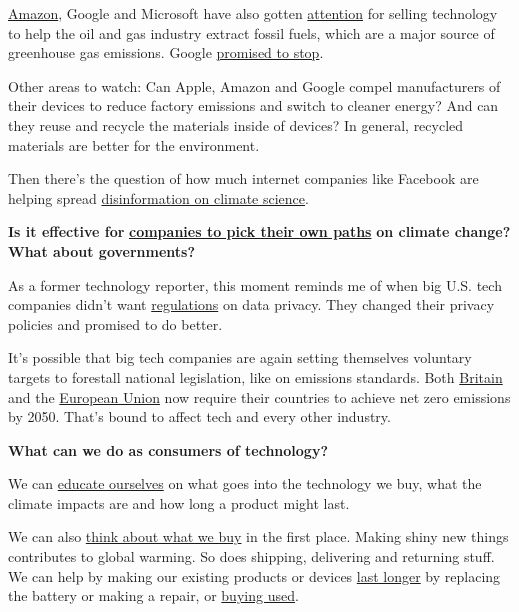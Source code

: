\href{https://www.nytimes3xbfgragh.onion/2019/04/10/technology/amazon-climate-change-letter.html}{Amazon},
Google and Microsoft have also gotten
\href{https://www.greenpeace.org/usa/reports/oil-in-the-cloud/}{attention}
for selling technology to help the oil and gas industry extract fossil
fuels, which are a major source of greenhouse gas emissions. Google
\href{https://www.cnbc.com/2020/05/20/google-ai-greenpeace-oil-gas.html}{promised
to stop}.

Other areas to watch: Can Apple, Amazon and Google compel manufacturers
of their devices to reduce factory emissions and switch to cleaner
energy? And can they reuse and recycle the materials inside of devices?
In general, recycled materials are better for the environment.

Then there's the question of how much internet companies like Facebook
are helping spread
\href{https://heated.world/p/fact-check-of-viral-climate-misinformation}{disinformation
on climate science}.

\textbf{Is it effective for}
\textbf{\href{https://www.nytimes3xbfgragh.onion/2020/01/23/business/corporate-climate-davos.html}{companies
to pick their own paths}} \textbf{on climate change? What about
governments?}

As a former technology reporter, this moment reminds me of when big U.S.
tech companies didn't want
\href{https://www.nytimes3xbfgragh.onion/2013/10/31/technology/no-us-action-so-states-move-on-privacy-law.html}{regulations}
on data privacy. They changed their privacy policies and promised to do
better.

It's possible that big tech companies are again setting themselves
voluntary targets to forestall national legislation, like on emissions
standards. Both
\href{https://www.gov.uk/government/news/uk-becomes-first-major-economy-to-pass-net-zero-emissions-law}{Britain}
and the
\href{https://www.wsj.com/articles/eu-to-cut-greenhouse-gas-emissions-to-zero-by-2050-11576203017}{European
Union} now require their countries to achieve net zero emissions by
2050. That's bound to affect tech and every other industry.

\textbf{What can we do as consumers of technology?}

We can
\href{https://www.nytimes3xbfgragh.onion/guides/year-of-living-better/how-to-reduce-your-carbon-footprint}{educate
ourselves} on what goes into the technology we buy, what the climate
impacts are and how long a product might last.

We can also
\href{https://www.nytimes3xbfgragh.onion/2020/07/08/technology/personaltech/tech-that-lasts.html}{think
about what we buy} in the first place. Making shiny new things
contributes to global warming. So does shipping, delivering and
returning stuff. We can help by making our existing products or devices
\href{https://www.nytimes3xbfgragh.onion/2020/07/01/technology/personaltech/make-your-tech-last-longer.html}{last
longer} by replacing the battery or making a repair, or
\href{https://www.nytimes3xbfgragh.onion/2016/04/28/technology/personaltech/taking-the-stigma-out-of-buying-usedelectronics.html}{buying
used}.

